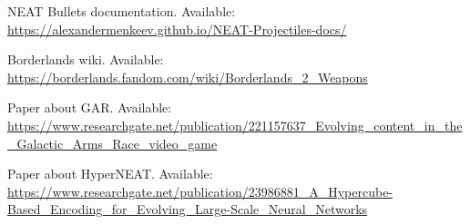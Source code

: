 \begin{thebibliography}{1}
     NEAT Bullets documentation. Available: \url{https://alexandermenkeev.github.io/NEAT-Projectiles-docs/}

     Borderlands wiki. Available: \url{https://borderlands.fandom.com/wiki/Borderlands_2_Weapons}

     Paper about GAR. Available: \url{https://www.researchgate.net/publication/221157637_Evolving_content_in_the_Galactic_Arms_Race_video_game}

     Paper about HyperNEAT. Available: \url{https://www.researchgate.net/publication/23986881_A_Hypercube-Based_Encoding_for_Evolving_Large-Scale_Neural_Networks}

\end{thebibliography}